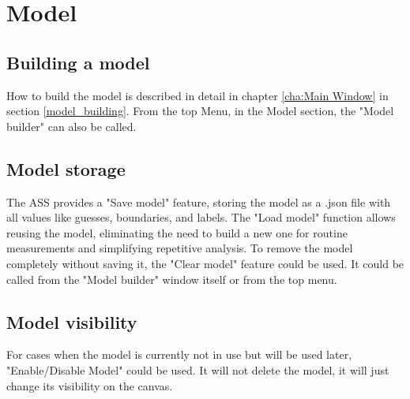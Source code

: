 \chapter{Model}
\label{cha:Model}
\section{Building a model}

How to build the model is described in detail in chapter \ref{cha:Main Window} in section \ref{model_building}. From the top Menu, in the Model section, the "Model builder" can also be called.

\section{Model storage}

The ASS provides a "Save model" feature, storing the model as a .json file with all values like guesses, boundaries, and labels. The "Load model" function allows reusing the model, eliminating the need to build a new one for routine measurements and simplifying repetitive analysis. To remove the model completely without saving it, the "Clear model" feature could be used. It could be called from the "Model builder" window itself or from the top menu.

\section{Model visibility}
For cases when the model is currently not in use but will be used later, "Enable/Disable Model" could be used. It will not delete the model, it will just change its visibility on the canvas.